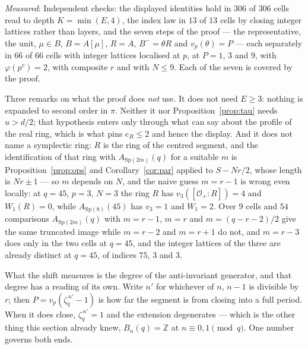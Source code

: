 \documentclass[11pt,a4paper]{article}
\theoremstyle{definition}
\newcommand{\Sp}{\mathrm{Sp}}
\newcommand{\ZZ}{\mathbb{Z}}
\newcommand{\cO}{\mathcal{O}}
\newcommand{\medido}[1]{\emph{Measured}: #1}
\begin{document}
\medskip

\medido{Independent checks: the displayed identities hold in $306$ of $306$ cells read to depth $K=\min(E,4)$, the index law in
$13$ of $13$ cells by closing integer lattices rather than layers, and the seven steps of the proof
--- the representative, the unit, $\mu\in B$, $B=A[\mu]$, $R=A$, $B^-=\theta R$ and
$v_p(\theta)=P$ --- each separately in $66$ of $66$ cells with integer lattices localised at $p$,
at $P=1$, $3$ and $9$, with $\varphi(p^v)=2$, with composite $r$ and with $N\le9$. Each of the
seven is covered by the proof.}

Three remarks on what the proof does \emph{not} use. It does not need $E\ge3$: nothing is expanded
to second order in $\pi$. Neither it nor Proposition~\ref{prop:tau} needs $u>d/2$; that hypothesis
enters only through what \cite{Cond} can say about the profile of the real
ring, which is what pins $e_R\le2$ and hence the display. And it does not name a symplectic
ring: $R$ is the ring of the centred segment, and the identification of that ring with
$A_{\Sp(2m)}(q)$ for a suitable $m$ is Proposition~\ref{prop:ops} and Corollary~\ref{cor:par}
applied to $S-Nr/2$, whose length is $Nr\pm1$ --- so $m$ depends on $N$, and the naive guess
$m=r-1$ is wrong even locally: at $q=45$, $p=3$, $N=3$ the ring $R$ has $v_3([\cO_+:R])=4$ and
$W_1(R)=0$, while $A_{\Sp(8)}(45)$ has $v_3=1$ and $W_1=2$. Over $9$ cells and $54$ comparisons $A_{\Sp(2m)}(q)$ with
$m=r-1$, $m=r$ and $m=(q-r-2)/2$ give the same truncated image while $m=r-2$ and $m=r+1$ do not, and $m=r-3$ does only in the
two cells at $q=45$, and
the integer lattices of the three are already distinct at $q=45$, of indices $75$, $3$ and $3$.

What the shift measures is the degree of the anti-invariant generator, and that degree has a
reading of its own. Write $n'$ for whichever of $n$, $n-1$ is divisible by $r$; then
$P=v_p(\zeta_q^{\,n'}-1)$ is how far the segment is from closing into a full period. When it does
close, $\zeta_q^{\,n'}=1$ and the extension degenerates --- which is the other thing this section
already knew, $B_n(q)=\ZZ$ at $n\equiv0,1\pmod q$. One number governs both ends.
\end{document}
